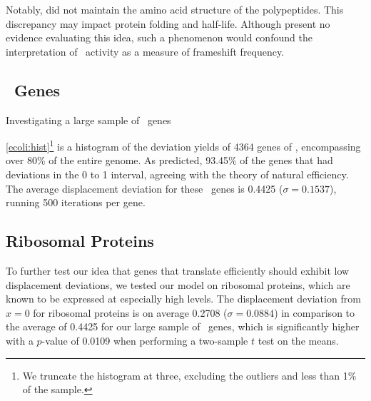\documentclass[12pt]{article}
\begin{document}
Notably, \citeauthor{weiss87} did not maintain the amino acid structure of the polypeptides.  
This discrepancy may impact protein folding and half-life.  Although \citeauthor{weiss87} 
present no evidence evaluating this idea, such a phenomenon would confound the interpretation 
of \bgals\ activity as a measure of frameshift frequency.


\subsection{\ecoli\ Genes}
\begin{cfigure}
  \caption{Investigating a large sample of \ecoli\ genes}
  \quad
\end{cfigure}

\autoref{ecoli:hist}\footnote{We truncate the histogram at three, excluding
  the outliers and less than 1\% of the sample.} is a histogram of the
deviation yields of 4364 genes of \ecoli, encompassing over 80\% of the entire
genome.  As predicted, 93.45\% of the genes that had deviations in the 0
to 1 interval, agreeing with the theory of natural efficiency.  The
average displacement deviation for these \ecoli\ genes is 0.4425 ($\sigma = 0.1537$), 
running 500 iterations per gene.

\subsection{Ribosomal Proteins}
\label{section:riboproteins}
To further test our idea that genes that translate efficiently should exhibit
low displacement deviations, we tested our model on ribosomal proteins, which
are known to be expressed at especially high levels.
The displacement deviation from $x=0$ for ribosomal proteins
is on average 0.2708 ($\sigma = 0.0884$) in comparison to the average of 0.4425 for our
large sample of \ecoli\ genes, which is significantly higher with a $p$-value of
0.0109 when performing a two-sample $t$ test on the means.
\end{document}
